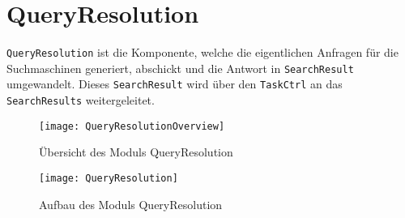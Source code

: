 
\section{QueryResolution}

\lstinline|QueryResolution| ist die Komponente, welche die eigentlichen Anfragen für die Suchmaschinen generiert, abschickt und die Antwort in \lstinline|SearchResult| umgewandelt. Dieses \lstinline|SearchResult| wird über den \lstinline|TaskCtrl| an das \lstinline|SearchResults| weitergeleitet.

\begin{figure}[htb]
    	\centering
  	\texttt{[image: QueryResolutionOverview]}
  	\caption{Übersicht des Moduls QueryResolution}
\end{figure}

\begin{figure}[htb]
    	\centering
  	\texttt{[image: QueryResolution]}
  	\caption{Aufbau des Moduls QueryResolution}
\end{figure}

%


\pagebreak
\clearpage


